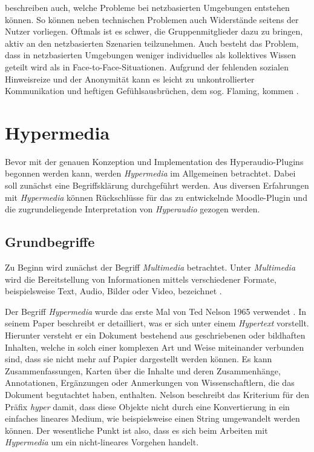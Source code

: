 \cite{reinmann2002analyse} beschreiben auch, welche Probleme bei netzbasierten Umgebungen entstehen können. So können neben technischen Problemen auch Widerstände seitens der Nutzer vorliegen. Oftmals ist es schwer, die Gruppenmitglieder dazu zu bringen, aktiv an den netzbasierten Szenarien teilzunehmen. Auch besteht das Problem, dass in netzbasierten Umgebungen weniger individuelles als kollektives Wissen geteilt wird als in Face-to-Face-Situationen. Aufgrund der fehlenden sozialen Hinweisreize und der Anonymität kann \glqq es leicht zu unkontrollierter Kommunikation und heftigen Gefühlsausbrüchen, dem sog. Flaming, kommen\grqq{} \citep{reinmann2002analyse}.


\section{Hypermedia}
Bevor mit der genauen Konzeption und Implementation des Hyperaudio-Plugins begonnen werden kann, werden \textit{Hypermedia} im Allgemeinen betrachtet. Dabei soll zunächst eine Begriffsklärung durchgeführt werden. Aus diversen Erfahrungen mit \textit{Hypermedia} können Rückschlüsse für das zu entwickelnde Moodle-Plugin und die zugrundeliegende Interpretation von \textit{Hyperaudio} gezogen werden.


\subsection{Grundbegriffe}
Zu Beginn wird zunächst der Begriff \textit{Multimedia} betrachtet. Unter \textit{Multimedia} wird die Bereitstellung von Informationen mittels verschiedener Formate, beispielsweise Text, Audio, Bilder oder Video, bezeichnet \citep{mayer2009multimedia,moos2010multimedia}.

Der Begriff \textit{Hypermedia} wurde das erste Mal von Ted Nelson 1965 verwendet \citep{nelson1965complex}. In seinem Paper beschreibt er detailliert, was er sich unter einem \textit{Hypertext} vorstellt. Hierunter versteht er ein Dokument bestehend aus geschriebenen oder bildhaften Inhalten, welche in solch einer komplexen Art und Weise miteinander verbunden sind, dass sie nicht mehr auf Papier dargestellt werden können. Es kann Zusammenfassungen, Karten über die Inhalte und deren Zusammenhänge, Annotationen, Ergänzungen oder Anmerkungen von Wissenschaftlern, die das Dokument begutachtet haben, enthalten. Nelson beschreibt das Kriterium für den Präfix \textit{hyper} damit, dass diese Objekte nicht durch eine Konvertierung in ein einfaches lineares Medium, wie beispielsweise einen String umgewandelt werden können. Der wesentliche Punkt ist also, dass es sich beim Arbeiten mit \textit{Hypermedia} um ein nicht-lineares Vorgehen handelt.


